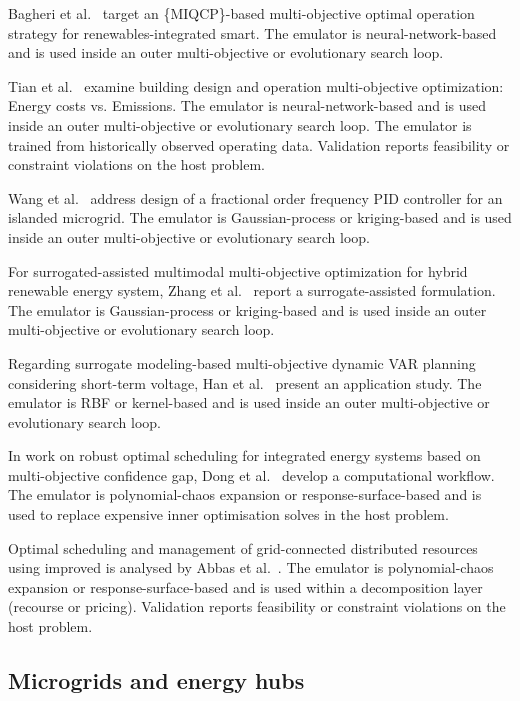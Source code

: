 Bagheri et al.~\cite{bagheri_miqcp-based_2025} target an \{MIQCP\}-based multi-objective optimal operation strategy for renewables-integrated smart. The emulator is neural-network-based and is used inside an outer multi-objective or evolutionary search loop.

Tian et al.~\cite{tian_building_2025} examine building design and operation multi-objective optimization: Energy costs vs. Emissions. The emulator is neural-network-based and is used inside an outer multi-objective or evolutionary search loop. The emulator is trained from historically observed operating data. Validation reports feasibility or constraint violations on the host problem.

Wang et al.~\cite{Wang2017} address design of a fractional order frequency PID controller for an islanded microgrid. The emulator is Gaussian-process or kriging-based and is used inside an outer multi-objective or evolutionary search loop.

For surrogated-assisted multimodal multi-objective optimization for hybrid renewable energy system, Zhang et al.~\cite{Zhang20234075} report a surrogate-assisted formulation. The emulator is Gaussian-process or kriging-based and is used inside an outer multi-objective or evolutionary search loop.

Regarding surrogate modeling-based multi-objective dynamic VAR planning considering short-term voltage, Han et al.~\cite{Han2018622} present an application study. The emulator is RBF or kernel-based and is used inside an outer multi-objective or evolutionary search loop.

In work on robust optimal scheduling for integrated energy systems based on multi-objective confidence gap, Dong et al.~\cite{Dong2023__2} develop a computational workflow. The emulator is polynomial-chaos expansion or response-surface-based and is used to replace expensive inner optimisation solves in the host problem.

Optimal scheduling and management of grid-connected distributed resources using improved is analysed by Abbas et al.~\cite{abbas_optimal_2024}. The emulator is polynomial-chaos expansion or response-surface-based and is used within a decomposition layer (recourse or pricing). Validation reports feasibility or constraint violations on the host problem.

\subsection{Microgrids and energy hubs}
\label{sec:apps:microgrid}


